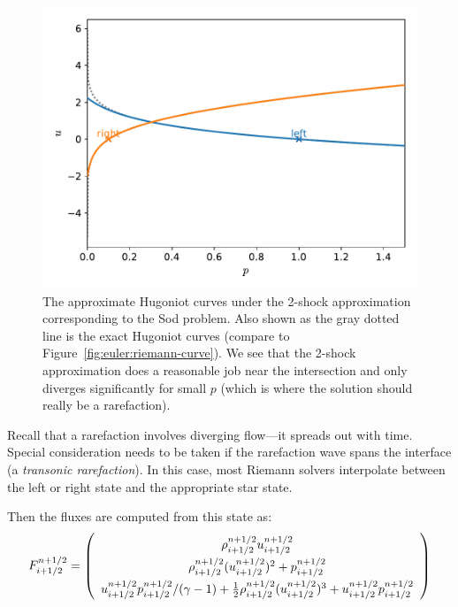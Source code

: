\begin{figure}[t]
\centering
\includegraphics[width=0.9\linewidth]{riemann-2shock-sod-phase}
\caption[The approximate (2-shock) Hugoniot curves corresponding to
  the Sod problem]{\label{fig:euler:riemann-2shock-curve} The
  approximate Hugoniot curves under the 2-shock approximation
  corresponding to the Sod problem.  Also shown as the gray dotted
  line is the exact Hugoniot curves (compare to
  Figure~\ref{fig:euler:riemann-curve}).  We see that the 2-shock
  approximation does a reasonable job near the intersection and only
  diverges significantly for small $p$ (which is where the solution
  should really be a
  rarefaction).\\ 
  }
\end{figure}



Recall that a rarefaction involves diverging flow---it spreads out
with time.  Special consideration needs to be taken if the rarefaction
wave spans the interface (a {\em transonic rarefaction}).  In this
case, most Riemann solvers interpolate between the left or right state
and the appropriate star state.

Then the fluxes are computed from this state as:
\begin{equation}
\renewcommand{\arraystretch}{1.5}
F_{i+1/2}^{n+1/2} = \left ( \begin{array}{c}
                             \rho_{i+1/2}^{n+1/2} u_{i+1/2}^{n+1/2} \\
                             \rho_{i+1/2}^{n+1/2} (u_{i+1/2}^{n+1/2})^2 + p_{i+1/2}^{n+1/2} \\
                             u_{i+1/2}^{n+1/2} p_{i+1/2}^{n+1/2} / (\gamma - 1)  +
                             \frac{1}{2} \rho_{i+1/2}^{n+1/2} (u_{i+1/2}^{n+1/2})^3 +
                             u_{i+1/2}^{n+1/2} p_{i+1/2}^{n+1/2}
                            \end{array} \right )
\renewcommand{\arraystretch}{1.0}
\end{equation}

